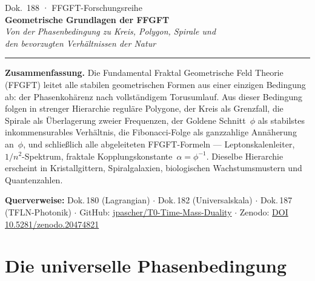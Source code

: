 
\thispagestyle{firstpage}
\begin{center}
  {\small\color{T0gray} Dok.~188 · FFGFT-Forschungsreihe}\\[6pt]
  {\LARGE\bfseries\color{T0blue}
    Geometrische Grundlagen der FFGFT}\\[6pt]
  {\large\itshape\color{T0gray}
    Von der Phasenbedingung zu Kreis, Polygon, Spirale und\\
    den bevorzugten Verhältnissen der Natur}\\[8pt]
  {\color{T0red}\rule{0.65\linewidth}{1.5pt}}
\end{center}
\vspace{4pt}

\begin{infobox}
\textbf{Zusammenfassung.}
Die Fundamental Fraktal Geometrische Feld Theorie (FFGFT) leitet alle
stabilen geometrischen Formen aus einer einzigen Bedingung ab: der
Phasenkohärenz nach vollständigem Torusumlauf. Aus dieser Bedingung
folgen in strenger Hierarchie reguläre Polygone, der Kreis als Grenzfall,
die Spirale als Überlagerung zweier Frequenzen, der Goldene Schnitt~$\phi$
als stabilstes inkommensurables Verhältnis, die Fibonacci-Folge als
ganzzahlige Annäherung an~$\phi$, und schließlich alle abgeleiteten
FFGFT-Formeln — Leptonskalenleiter, $1/n^2$-Spektrum, fraktale
Kopplungskonstante~$\alpha = \phi^{-1}$. Dieselbe Hierarchie erscheint
in Kristallgittern, Spiralgalaxien, biologischen Wachstumsmustern und
Quantenzahlen.

\smallskip\noindent\textbf{Querverweise:}
Dok.\,180 (Lagrangian) $\cdot$
Dok.\,182 (Universalskala) $\cdot$
Dok.\,187 (TFLN-Photonik) $\cdot$
GitHub: \href{https://github.com/jpascher/T0-Time-Mass-Duality}{jpascher/T0-Time-Mass-Duality} $\cdot$
Zenodo: \href{https://zenodo.org/records/20474821}{DOI 10.5281/zenodo.20474821}
\end{infobox}

\tableofcontents
\bigskip

\section{Die universelle Phasenbedingung}

